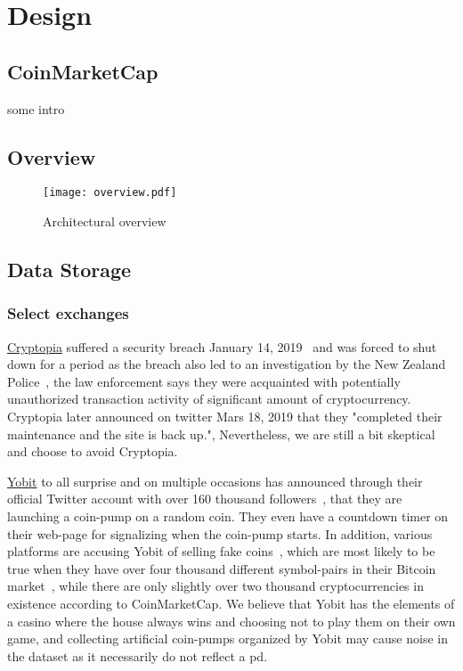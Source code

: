 \chapter{Design}\label{ch:design}

\section{CoinMarketCap}\label{sec:coinmarketcap}
some intro
\section{Overview}
\begin{figure}[ht]
    \centering
    \texttt{[image: overview.pdf]}
    \caption{Architectural overview}
    \label{fig:overview}
\end{figure}

\section{Data Storage}
%
\subsection{Select exchanges}

\href{https://www.cryptopia.co.nz/}{Cryptopia} suffered a security breach January 14, 2019~\cite{cryptopia_breach_2} and was forced to shut down for a period as the breach also led to an investigation by the New Zealand Police~\cite{cryptopia_breach_1}, the law enforcement says they were acquainted with potentially unauthorized transaction activity of significant amount of cryptocurrency. Cryptopia later announced on twitter Mars 18, 2019 that they "completed their maintenance and the site is back up.", Nevertheless, we are still a bit skeptical and choose to avoid Cryptopia.

\href{https://yobit.net/en/}{Yobit} to all surprise and on multiple occasions has announced through their official Twitter account with over 160 thousand followers~\cite{yobit_twitter}, that they are launching a coin-pump on a random coin. They even have a countdown timer on their web-page for signalizing when the coin-pump starts. In addition, various platforms are accusing Yobit of selling fake coins~\cite{yobit_fake_1, yobit_fake_2, yobit_fake_3}, which are most likely to be true when they have over four thousand different symbol-pairs in their Bitcoin market~\cite{yobit_market}, while there are only slightly over two thousand cryptocurrencies in existence according to CoinMarketCap. We believe that Yobit has the elements of a casino where the house always wins and choosing not to play them on their own game, and collecting artificial coin-pumps organized by Yobit may cause noise in the dataset as it necessarily do not reflect a \ac{pd}.

